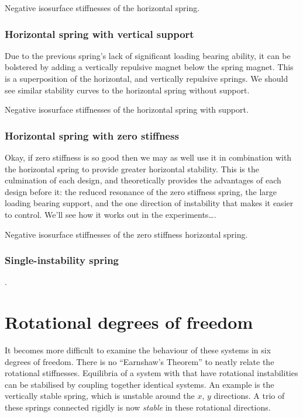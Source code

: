   {Negative isosurface stiffnesses of the horizontal spring.}

\subsubsection{Horizontal spring with vertical support}

Due to the previous spring's lack of significant loading bearing ability, it
can be bolstered by adding a vertically repulsive magnet below the spring
magnet. This is a superposition of the horizontal, and vertically repulsive
springs. We should see similar stability curves to the horizontal spring
without support.

  {Negative isosurface stiffnesses of the horizontal spring with support.}

\subsubsection{Horizontal spring with zero stiffness}

Okay, if zero stiffness is so good then we may as well use it in combination
with the horizontal spring to provide greater horizontal stability. This is
the culmination of each design, and theoretically provides the advantages of
each design before it: the reduced resonance of the zero stiffness spring, the
large loading bearing support, and the one direction of instability that makes
it easier to control. We'll see how it works out in the experiments\dots.

  {Negative isosurface stiffnesses of the zero stiffness horizontal spring.}


\subsubsection{Single-instability spring}

\cite{choi2003}. 



\section{Rotational degrees of freedom}

It becomes more difficult to examine the behaviour of these systems in
six degrees of freedom. There is no ``Earnshaw's Theorem'' to neatly
relate the rotational stiffnesses. Equilibria of a system with that
have rotational instabilities can be stabilised by coupling together
identical systems. An example is the vertically stable spring, which
is unstable around the $x$, $y$ directions. A trio of these springs
connected rigidly is now \emph{stable} in these rotational directions.

